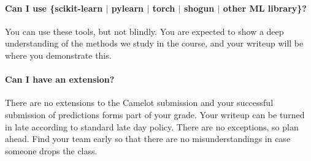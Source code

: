 \documentclass[12pt,letterpaper]{article}
\begin{document}
\paragraph{Can I use \{scikit-learn $|$ pylearn $|$ torch $|$ shogun $|$ other ML library\}?}
You can use these tools, but not blindly.  You are expected to show a
deep understanding of the methods we study in the course, and your
writeup will be where you demonstrate this.

\paragraph{Can I have an extension?}
There are no extensions to the Camelot submission and your successful
submission of predictions forms part of your grade.  Your writeup can
be turned in late according to standard late day policy.  There are no
exceptions, so plan ahead.  Find your team early so that there are no
misunderstandings in case someone drops the class.
\end{document}
